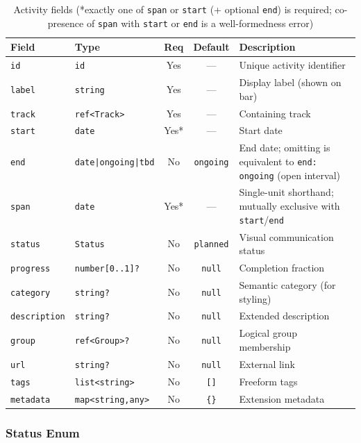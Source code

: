 \begin{table}[h]
\centering
\small
\begin{tabular}{llccp{4cm}}
\toprule
\textbf{Field} & \textbf{Type} & \textbf{Req} & \textbf{Default} & \textbf{Description} \\
\midrule
\texttt{id} & \texttt{id} & Yes & --- & Unique activity identifier \\
\texttt{label} & \texttt{string} & Yes & --- & Display label (shown on bar) \\
\texttt{track} & \texttt{ref<Track>} & Yes & --- & Containing track \\
\texttt{start} & \texttt{date} & Yes* & --- & Start date \\
\texttt{end} & \texttt{date|ongoing|tbd} & No & \texttt{ongoing} & End date; omitting is equivalent to \texttt{end: ongoing} (open interval) \\
\texttt{span} & \texttt{date} & Yes* & --- & Single-unit shorthand; mutually exclusive with \texttt{start}/\texttt{end} \\
\texttt{status} & \texttt{Status} & No & \texttt{planned} & Visual communication status \\
\texttt{progress} & \texttt{number[0..1]?} & No & \texttt{null} & Completion fraction \\
\texttt{category} & \texttt{string?} & No & \texttt{null} & Semantic category (for styling) \\
\texttt{description} & \texttt{string?} & No & \texttt{null} & Extended description \\
\texttt{group} & \texttt{ref<Group>?} & No & \texttt{null} & Logical group membership \\
\texttt{url} & \texttt{string?} & No & \texttt{null} & External link \\
\texttt{tags} & \texttt{list<string>} & No & \texttt{[]} & Freeform tags \\
\texttt{metadata} & \texttt{map<string,any>} & No & \texttt{\{\}} & Extension metadata \\
\bottomrule
\end{tabular}
\caption{Activity fields (*exactly one of \texttt{span} or \texttt{start} (+ optional \texttt{end}) is required; co-presence of \texttt{span} with \texttt{start} or \texttt{end} is a well-formedness error)}
\label{tab:activity-fields}
\end{table}

\subsubsection{Status Enum}
\label{sec:status-enum}

